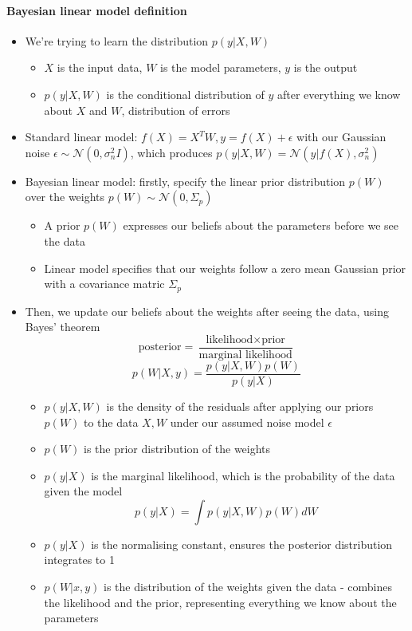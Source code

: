 \documentclass[12pt]{article}
\begin{document}
\paragraph{Bayesian linear model definition}
\begin{itemize}
    \item We're trying to learn the distribution $p(y|X,W)$
    \begin{itemize}
        \item $X$ is the input data, $W$ is the model parameters, $y$ is the output
        \item $p(y|X,W)$ is the conditional distribution of $y$ after everything we know about $X$ and $W$, distribution of errors
    \end{itemize}
    \item Standard linear model: $f(X) = X^T W, y = f(X) + \epsilon$ with our Gaussian noise $\epsilon \sim \mathcal{N}(0, \sigma^2_nI)$, which produces $p(y|X,W) = \mathcal{N}(y|f(X), \sigma^2_n)$
    \item Bayesian linear model: firstly, specify the linear prior distribution $p(W)$ over the weights $p(W) \sim \mathcal{N}(0, \Sigma_p)$
    \begin{itemize}
        \item A prior $p(W)$ expresses our beliefs about the parameters before we see the data
        \item Linear model specifies that our weights follow a zero mean Gaussian prior with a covariance matric $\Sigma_p$
    \end{itemize}
    \item Then, we update our beliefs about the weights after seeing the data, using Bayes' theorem
\begin{equation}
    \text{posterior} = \frac{\text{likelihood} \times \text{prior}}{\text{marginal likelihood}}
\end{equation}
\begin{equation}
    p(W|X, y) = \frac{p(y|X,W)p(W)}{p(y|X)}
\end{equation}
    \begin{itemize}
        \item $p(y|X,W)$ is the density of the residuals after applying our priors $p(W)$ to the data $X,W$ under our assumed noise model $\epsilon$
        \item $p(W)$ is the prior distribution of the weights
        \item $p(y|X)$ is the marginal likelihood, which is the probability of the data given the model
\begin{equation}
    p(y|X) = \int p(y|X,W)p(W)dW
\end{equation}
        \item $p(y|X)$ is the normalising constant, ensures the posterior distribution integrates to 1
        \item $p(W|x, y)$ is the distribution of the weights given the data - combines the likelihood and the prior, representing everything we know about the parameters
    \end{itemize}
\end{itemize}
\end{document}
